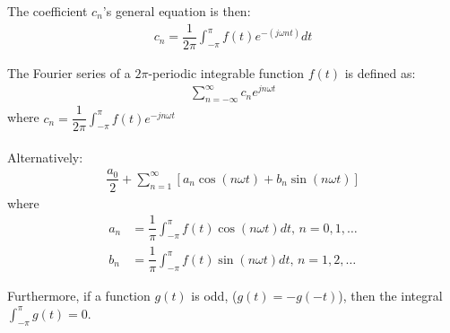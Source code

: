 The coefficient $c_n$'s general equation is then:
\begin{align*}
	c_n = \dfrac{1}{2\pi} \int_{-\pi}^{\pi} f(t) e^{-(j \omega nt)}dt
\end{align*} 
\begin{definition} \label{def:fourier_definition}
The Fourier series of a $2\pi$-periodic integrable function $f(t)$ is defined as:
\begin{align*}
	\sum_{n=-\infty}^\infty c_n e^{j n \omega t}
\end{align*}
where $c_n = \dfrac{1}{2\pi}\int_{- \pi}^\pi f(t) e^{-j n \omega t}$
\\ \\
Alternatively:
\begin{align*}
	\dfrac{a_0}{2} + \sum_{n=1}^{\infty} \left[ a_n \cos(n \omega t) + b_n \sin(n \omega t)\right]
\end{align*} 
where
\begin{align*}
	a_n 
	&= \dfrac{1}{\pi} \int_{-\pi}^\pi f(t) \cos (n \omega t) dt, \, n=0,1,\dots\\
	b_n
	&= \dfrac{1}{\pi} \int_{-\pi}^\pi f(t) \sin (n \omega t) dt, \, n=1,2,\dots	
\end{align*}
\end{definition}

Furthermore, if a function $g(t)$ is odd, ($g(t) = -g(-t)$), then the integral $\int_{-\pi}^\pi g(t) = 0$.
